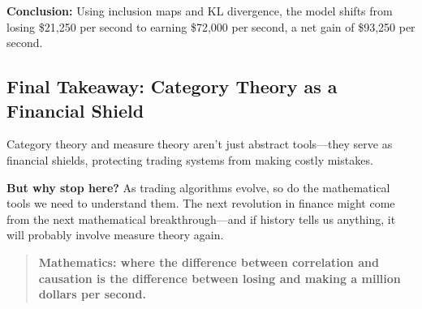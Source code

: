 \textbf{Conclusion:} Using inclusion maps and KL divergence, the model shifts from losing \$21,250 per second to earning \$72,000 per second, a net gain of \$93,250 per second.

\subsection{Final Takeaway: Category Theory as a Financial Shield}

Category theory and measure theory aren’t just abstract tools—they serve as financial shields, protecting trading systems from making costly mistakes. 

\textbf{But why stop here?} As trading algorithms evolve, so do the mathematical tools we need to understand them. The next revolution in finance might come from the next mathematical breakthrough—and if history tells us anything, it will probably involve measure theory again.

\begin{quote}
\textbf{Mathematics: where the difference between correlation and causation is the difference between losing and making a million dollars per second.}
\end{quote}
